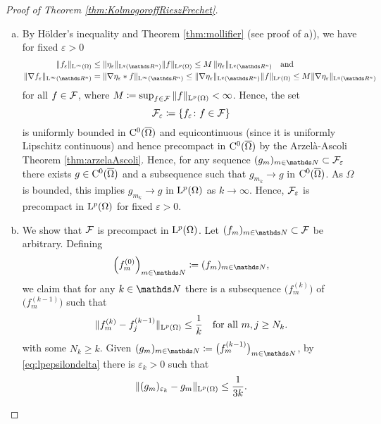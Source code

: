 \begin{proof}[Proof of Theorem \ref{thm:KolmogoroffRieszFrechet}]
\begin{enumerate}[I)]
\begin{enumerate}[a)]
      \item By Hölder's inequality and Theorem \ref{thm:mollifier} (see proof of a)), we have for fixed $\varepsilon > 0$
         \begin{align*}
           \| f_\varepsilon\|_{\Ell^\infty(\Omega)}
           &\leq \|\eta_\varepsilon \|_{\Ell^q(\R^n)} \|f\|_{\Ell^p(\Omega)}
           \leq M \, \|\eta_\varepsilon \|_{\Ell^q(\R^n)} \quad\text{and} \\
           \|\nabla f_\varepsilon \|_{\Ell^\infty(\R^n)}
           &= \| \nabla \eta_\varepsilon \ast f \|_{\Ell^\infty(\R^n)}
           \leq \| \nabla \eta_\varepsilon \|_{\Ell^q(\R^n)} \|f\|_{\Ell^p(\Omega)}
           \leq M \|\nabla \eta_\varepsilon \|_{\Ell^q(\R^n)} 
         \end{align*}
         for all $f \in \mathcal{F}$, where $M \coloneqq \sup_{f \in \mathcal{F}} \| f\|_{\mathrm{L}^p(\Omega)} < \infty$.
         Hence, the set $$\mathcal{F}_\varepsilon \coloneqq \{ f_\varepsilon \colon f \in \mathcal{F} \}$$ is uniformly bounded in $\mathrm{C}^0(\overline\Omega)$ and equicontinuous (since it is uniformly Lipschitz continuous) and hence precompact in $\mathrm{C}^0(\overline\Omega)$ by the Arzel\`a-Ascoli Theorem \ref{thm:arzelaAscoli}.
        Hence, for any sequence $(g_m)_{m \in \N} \subset \FF_\varepsilon$ there exists $g \in \mathrm{C}^0(\overline\Omega)$ and a subsequence such that $g_{m_k} \to g$ in $\mathrm{C}^0(\overline\Omega)$.
        As $\Omega$ is bounded, this implies $g_{m_k} \to g$ in $\mathrm{L}^p(\Omega)$ as $k \to \infty$.
        Hence, $\mathcal{F}_\varepsilon$ is precompact in $\mathrm{L}^p(\Omega)$ for fixed $\varepsilon > 0$.
      \item 
        We show that $\mathcal{F}$ is precompact in $\mathrm{L}^p(\Omega)$.
        Let $(f_m)_{m \in \N} \subset \FF$ be arbitrary.
        Defining $$\Big(f_m^{(0)}\Big)_{m \in \N} \coloneqq (f_m)_{m \in \N},$$ we claim that for any $k \in \N$ there is a subsequence $\Big(f_m^{(k)}\Big)$ of $\Big(f_m^{(k - 1)}\Big)$ such that
        \begin{equation}
          \label{eq:lpcauchy}
          \|f_m^{(k)} - f_j^{(k - 1)} \|_{\mathrm{L}^p(\Omega)} \leq \frac{1}{k} \quad\text{for all } m,j \geq N_k.
        \end{equation}
        with some $N_k \geq k$.
        Given $(g_m)_{m \in \N} \coloneqq \big( f_m^{(k- 1)}\big)_{m \in \N}$, by \eqref{eq:lpepsilondelta} there is $\varepsilon_k > 0$ such that
        \begin{equation}
          \label{eq:cauchyMollifier}
          \|(g_m)_{\varepsilon_k} - g_m\|_{\Ell^p(\Omega)} \leq \frac{1}{3k}.

\end{equation}
\end{enumerate}
\end{enumerate}
\end{proof}
